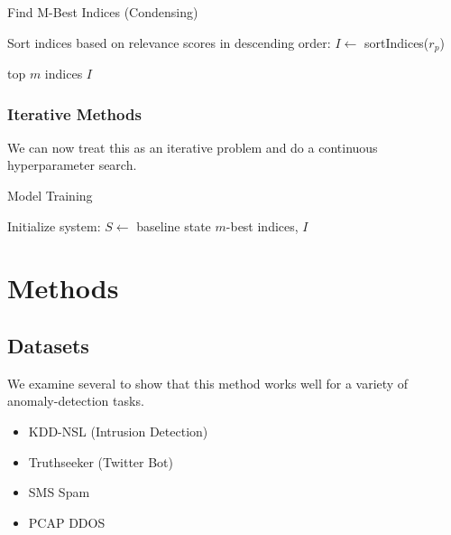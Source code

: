 \documentclass[sigconf]{acmart}
\begin{document}
\begin{algorithm}
  \caption{Find M-Best Indices (Condensing)}
  
  
  
  Sort indices based on relevance scores in descending order: $I \gets$ sortIndices($r_p$)\;
  
  \Return top $m$ indices $I$\;
\end{algorithm}



\subsubsection{Iterative Methods}
We can now treat this as an iterative problem and do a continuous hyperparameter search.



\begin{algorithm}
  \caption{Model Training}
  
  
  Initialize system: $S \gets$ baseline state\;
  \Return $m$-best indices, $I$\;
\end{algorithm}







\section{Methods}

\subsection{Datasets}
We examine several to show that this method works well for a variety of anomaly-detection tasks.
\begin{itemize}
    \item KDD-NSL (Intrusion Detection)
    \item Truthseeker (Twitter Bot)
    \item SMS Spam
    \item PCAP DDOS
\end{itemize}
\end{document}
